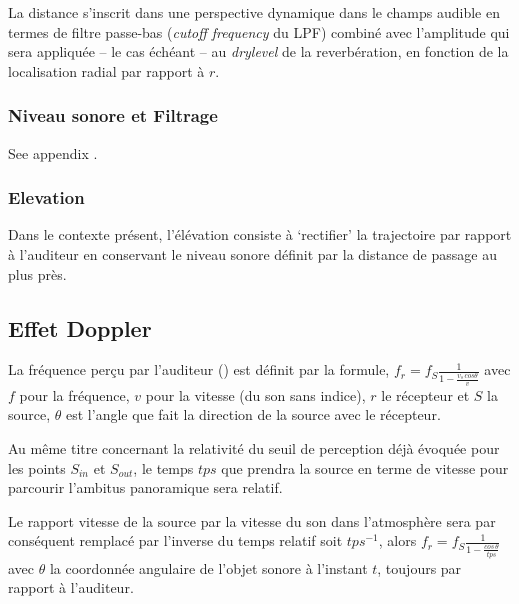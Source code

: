 La distance s'inscrit dans une perspective dynamique dans le champs audible en termes de filtre passe-bas (\textit{cutoff frequency} du LPF) combin\'e avec l'amplitude qui sera appliqu\'ee -- le cas \'ech\'eant -- au \textit{drylevel} de la reverb\'eration, en fonction de la localisation radial par rapport \`a $r$.%

\subsubsection*{Niveau sonore et Filtrage}

See appendix .

\subsubsection*{Elevation}

Dans le contexte pr\'esent, l'\'el\'evation consiste \`a `rectifier' la trajectoire par rapport \`a l'auditeur en conservant le niveau sonore d\'efinit par la distance de passage au plus pr\`es.%

\normalfont

\subsection*{Effet Doppler}

La fr\'equence per\c{c}u par l'auditeur () est d\'efinit par la formule,
$f_r= \displaystyle f_S  \frac{1}{\displaystyle 1- \frac{v_s \, cos \theta}{v}}$
avec $f$ pour la fr\'equence, $v$ pour la vitesse (du son sans indice), $r$ le r\'ecepteur et $S$ la source, $\theta$ est l'angle que fait la direction de la source avec le r\'ecepteur.

Au m\^eme titre concernant la relativit\'e du seuil de perception d\'ej\`a \'evoqu\'ee pour les points $S_{in}$ et $S_{out}$, le temps $tps$ que prendra la source en terme de vitesse pour parcourir l'ambitus panoramique sera relatif. 

Le rapport vitesse de la source par la vitesse du son dans l'atmosph\`ere sera par cons\'equent remplac\'e par l'inverse du temps relatif soit $tps^{-1}$, alors $f_r=f_S \displaystyle \frac{1}{1- \displaystyle \frac{cos \, \theta}{tps}}$ avec $\theta$ la coordonn\'ee angulaire de l'objet sonore \`a l'instant $t$, toujours par rapport \`a l'auditeur.

\newpage

